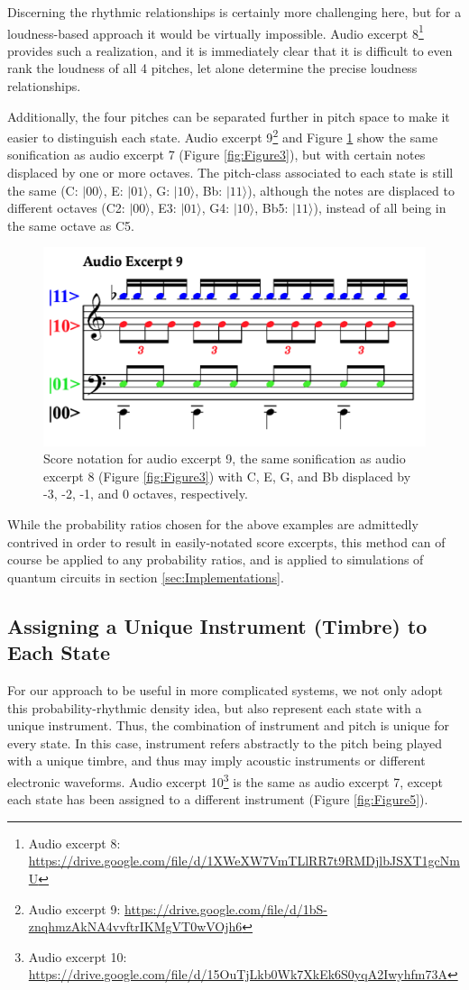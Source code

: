 \documentclass[10pt,twocolumn]{article}
\begin{document}
Discerning the rhythmic relationships is certainly more challenging here, but for a loudness-based approach it would be virtually impossible. Audio excerpt 8\footnote{Audio excerpt 8: \url{https://drive.google.com/file/d/1XWeXW7VmTLlRR7t9RMDjlbJSXT1gcNmU}} provides such a realization, and it is immediately clear that it is difficult to even rank the loudness of all 4 pitches, let alone determine the precise loudness relationships.

Additionally, the four pitches can be separated further in pitch space to make it easier to distinguish each state. Audio excerpt 9\footnote{Audio excerpt 9: \url{https://drive.google.com/file/d/1bS-znqhmzAkNA4vvftrIKMgVT0wVOjh6}} and Figure \ref{fig:Figure4} show the same sonification as audio excerpt 7 (Figure \ref{fig:Figure3}), but with certain notes displaced by one or more octaves. The pitch-class associated to each state is still the same (C: $|00\rangle$, E: $|01\rangle$, G: $|10\rangle$, Bb: $|11\rangle$), although the notes are displaced to different octaves (C2: $|00\rangle$, E3: $|01\rangle$, G4: $|10\rangle$, Bb5: $|11\rangle$), instead of all being in the same octave as C5.

\begin{figure}[h]
\centering
  \includegraphics[width=.45\textwidth]{fig/Figure 4.png}
        \caption{Score notation for audio excerpt 9, the same sonification as audio excerpt 8 (Figure \ref{fig:Figure3}) with C, E, G, and Bb displaced by -3, -2, -1, and 0 octaves, respectively.}
\label{fig:Figure4}
\end{figure}

While the probability ratios chosen for the above examples are admittedly contrived in order to result in easily-notated score excerpts, this method can of course be applied to any probability ratios, and is applied to simulations of quantum circuits in section \ref{sec:Implementations}.

\subsection{Assigning a Unique Instrument (Timbre) to Each State}

For our approach to be useful in more complicated systems, we not only adopt this probability-rhythmic density idea, but also represent each state with a unique instrument. Thus, the combination of instrument and pitch is unique for every state. In this case, instrument refers abstractly to the pitch being played with a unique timbre, and thus may imply acoustic instruments or different electronic waveforms. Audio excerpt 10\footnote{Audio excerpt 10: \url{https://drive.google.com/file/d/15OuTjLkb0Wk7XkEk6S0yqA2Iwyhfm73A}} is the same as audio excerpt 7, except each state has been assigned to a different instrument (Figure \ref{fig:Figure5}).
\end{document}
